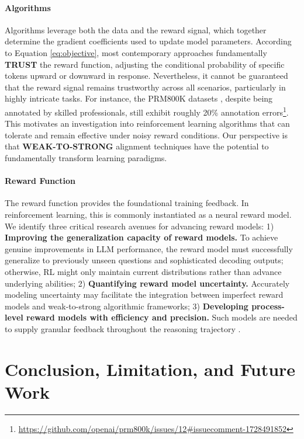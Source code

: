 \begin{itemize}[topsep=0pt]
\paragraph{Algorithms} Algorithms leverage both the data and the reward signal, which together determine the gradient coefficients used to update model parameters. According to Equation \ref{eq:objective}, most contemporary approaches fundamentally \textbf{TRUST} the reward function, adjusting the conditional probability of specific tokens upward or downward in response. Nevertheless, it cannot be guaranteed that the reward signal remains trustworthy across all scenarios, particularly in highly intricate tasks. For instance, the PRM800K datasets \citep{lightman2023let}, despite being annotated by skilled professionals, still exhibit roughly 20\% annotation errors\footnote{\url{https://github.com/openai/prm800k/issues/12\#issuecomment-1728491852}}. This motivates an investigation into reinforcement learning algorithms that can tolerate and remain effective under noisy reward conditions. Our perspective is that \textbf{WEAK-TO-STRONG} \citep{burns2023weak} alignment techniques have the potential to fundamentally transform learning paradigms.

\paragraph{Reward Function} The reward function provides the foundational training feedback. In reinforcement learning, this is commonly instantiated as a neural reward model. We identify three critical research avenues for advancing reward models: 1) \textbf{Improving the generalization capacity of reward models.} To achieve genuine improvements in LLM performance, the reward model must successfully generalize to previously unseen questions and sophisticated decoding outputs; otherwise, RL might only maintain current distributions rather than advance underlying abilities; 2) \textbf{Quantifying reward model uncertainty.} Accurately modeling uncertainty may facilitate the integration between imperfect reward models and weak-to-strong algorithmic frameworks; 3) \textbf{Developing process-level reward models with efficiency and precision.} Such models are needed to supply granular feedback throughout the reasoning trajectory \citep{lightman2023let,wang2023math}.

\section{Conclusion, Limitation, and Future Work} 


\end{itemize}
